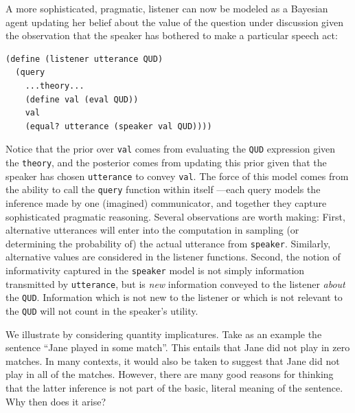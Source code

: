 \documentclass[pdfextras]{handbook}
\begin{document}
A more sophisticated, pragmatic, listener can now be modeled as a Bayesian agent updating her belief about the value of the question under discussion given the observation that the speaker has bothered to make a particular speech act:
\begin{lstlisting}
(define (listener utterance QUD)
  (query
    ...theory...
    (define val (eval QUD))
    val
    (equal? utterance (speaker val QUD))))
\end{lstlisting}
Notice that the prior over \lstinline{val} comes from evaluating the \lstinline{QUD} expression given the \lstinline{theory}, and the posterior comes from updating this prior given that the speaker has chosen \lstinline{utterance} to convey \lstinline{val}.
The force of this model comes from the ability to call the \lstinline{query} function within itself \citep{Stuhlmueller2013}---each query models the inference made by one (imagined) communicator, and together they capture sophisticated pragmatic reasoning. 
Several observations are worth making: First, alternative utterances will enter into the computation in sampling (or determining the probability of) the actual utterance from \lstinline{speaker}. 
Similarly, alternative values are considered in the listener functions.
Second, the notion of informativity captured in the \lstinline{speaker} model is not simply information transmitted by \lstinline{utterance}, but is \emph{new} information conveyed to the listener \emph{about} the \lstinline{QUD}. 
Information which is not new to the listener or which is not relevant to the \lstinline{QUD} will not count in the speaker's utility.

We illustrate by considering quantity implicatures. 
Take as an example the sentence ``Jane played in some match''. 
This entails that Jane did not play in zero matches. 
In many contexts, it would also be taken to suggest that Jane did not play in all of the matches. 
However, there are many good reasons for thinking that the latter inference is not part of the basic, literal meaning of the sentence\citep{grice89,geurts2010quantity}. 
Why then does it arise?


\end{document}
